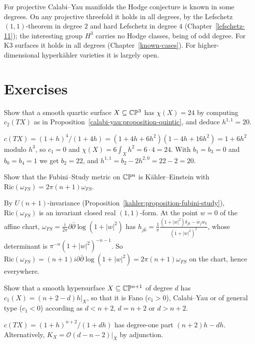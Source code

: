 \begin{remark}\label{calabi-yau:remark-hodge-conjecture}
For projective Calabi--Yau manifolds the Hodge conjecture is known in some degrees. On any projective threefold it holds in all degrees, by the Lefschetz $(1,1)$-theorem
in degree $2$ and hard Lefschetz in degree $4$ (Chapter~\ref{lefschetz-11}); the interesting group $H^3$ carries no Hodge classes, being of odd degree. For K3 surfaces it holds
in all degrees (Chapter~\ref{known-cases}). For higher-dimensional hyperk\"ahler varieties it is largely open.
\end{remark}

\section{Exercises}\label{calabi-yau:section-exercises}

\begin{exercise}\label{calabi-yau:exercise-k3-hodge}
Show that a smooth quartic surface $X \subseteq \mathbb{C}\mathbb{P}^3$ has $\chi(X) = 24$ by computing $c_2(TX)$ as in Proposition~\ref{calabi-yau:proposition-quintic}, and deduce $h^{1,1} = 20$.
\end{exercise}

\begin{solution}
$c(TX) = (1 + h)^4/(1 + 4h) = (1 + 4h + 6h^2)(1 - 4h + 16h^2) = 1 + 6h^2$ modulo $h^3$, so $c_1 = 0$ and $\chi(X) = 6\int_Xh^2 = 6 \cdot 4 = 24$. With $b_1 = b_3 = 0$ and $b_0 = b_4 = 1$
we get $b_2 = 22$, and $h^{1,1} = b_2 - 2h^{2,0} = 22 - 2 = 20$.
\end{solution}

\begin{exercise}\label{calabi-yau:exercise-ricci-projective}
Show that the Fubini--Study metric on $\mathbb{C}\mathbb{P}^n$ is K\"ahler--Einstein with $\mathrm{Ric}(\omega_{FS}) = 2\pi(n + 1)\omega_{FS}$.
\end{exercise}

\begin{solution}
By $U(n+1)$-invariance (Proposition~\ref{kahler:proposition-fubini-study}), $\mathrm{Ric}(\omega_{FS})$ is an invariant closed real $(1,1)$-form. At the point $w = 0$ of the affine
chart, $\omega_{FS} = \frac{i}{2\pi}\partial\bar\partial\log(1 + |w|^2)$ has $h_{j\bar k} = \frac1\pi\frac{(1 + |w|^2)\delta_{jk} - \bar w_jw_k}{(1 + |w|^2)^2}$, whose determinant is
$\pi^{-n}(1 + |w|^2)^{-n-1}$. So $\mathrm{Ric}(\omega_{FS}) = (n + 1)i\partial\bar\partial\log(1 + |w|^2) = 2\pi(n + 1)\omega_{FS}$ on the chart, hence everywhere.
\end{solution}

\begin{exercise}\label{calabi-yau:exercise-hypersurface-euler}
Show that a smooth hypersurface $X \subseteq \mathbb{C}\mathbb{P}^{n+1}$ of degree $d$ has $c_1(X) = (n + 2 - d)h|_X$, so that it is Fano ($c_1 > 0$), Calabi--Yau or of general type
($c_1 < 0$) according as $d < n + 2$, $d = n + 2$ or $d > n + 2$.
\end{exercise}

\begin{solution}
$c(TX) = (1 + h)^{n+2}/(1 + dh)$ has degree-one part $(n + 2)h - dh$. Alternatively, $K_X = \mathcal{O}(d - n - 2)|_X$ by adjunction.
\end{solution}
